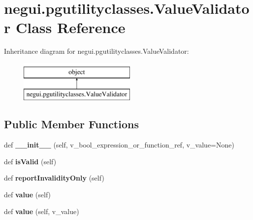 \hypertarget{classnegui_1_1pgutilityclasses_1_1ValueValidator}{}\section{negui.\+pgutilityclasses.\+Value\+Validator Class Reference}
\label{classnegui_1_1pgutilityclasses_1_1ValueValidator}
Inheritance diagram for negui.\+pgutilityclasses.\+Value\+Validator\+:\begin{figure}[H]
\begin{center}
\leavevmode
\includegraphics[height=2.000000cm]{classnegui_1_1pgutilityclasses_1_1ValueValidator}
\end{center}
\end{figure}
\subsection*{Public Member Functions}
\begin{DoxyCompactItemize}
\item 
def {\bfseries \+\_\+\+\_\+init\+\_\+\+\_\+} (self, v\+\_\+bool\+\_\+expression\+\_\+or\+\_\+function\+\_\+ref, v\+\_\+value=None)\hypertarget{classnegui_1_1pgutilityclasses_1_1ValueValidator_ae49429c90976660d590d982a54a17fc3}{}\label{classnegui_1_1pgutilityclasses_1_1ValueValidator_ae49429c90976660d590d982a54a17fc3}

\item 
def {\bfseries is\+Valid} (self)\hypertarget{classnegui_1_1pgutilityclasses_1_1ValueValidator_a61381bce59fbd5633aee3aa2e73ad341}{}\label{classnegui_1_1pgutilityclasses_1_1ValueValidator_a61381bce59fbd5633aee3aa2e73ad341}

\item 
def {\bfseries report\+Invalidity\+Only} (self)\hypertarget{classnegui_1_1pgutilityclasses_1_1ValueValidator_a9e28ee42625e74bf73cd3e294bfcc1dd}{}\label{classnegui_1_1pgutilityclasses_1_1ValueValidator_a9e28ee42625e74bf73cd3e294bfcc1dd}

\item 
def {\bfseries value} (self)\hypertarget{classnegui_1_1pgutilityclasses_1_1ValueValidator_a8e3868af377f33e5ffab559920c2b091}{}\label{classnegui_1_1pgutilityclasses_1_1ValueValidator_a8e3868af377f33e5ffab559920c2b091}

\item 
def {\bfseries value} (self, v\+\_\+value)\hypertarget{classnegui_1_1pgutilityclasses_1_1ValueValidator_a74697f81f532d96a5d27d7ca199aca5d}{}\label{classnegui_1_1pgutilityclasses_1_1ValueValidator_a74697f81f532d96a5d27d7ca199aca5d}

\end{DoxyCompactItemize}


